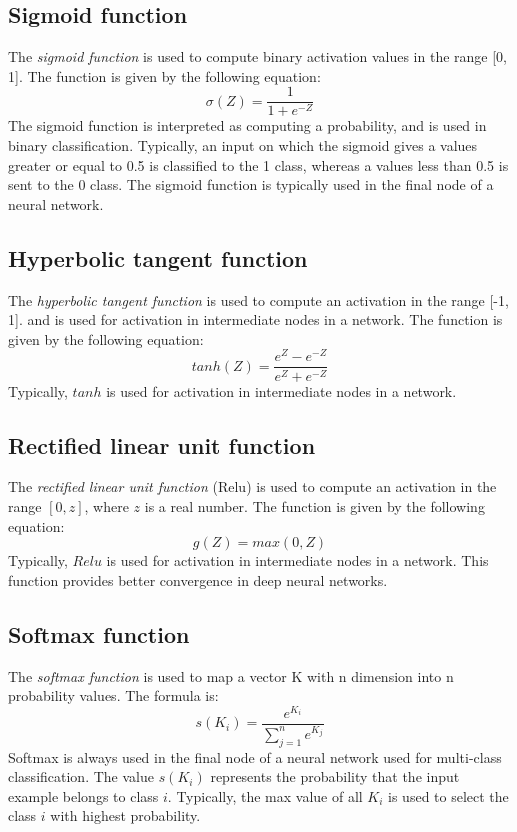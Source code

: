 \documentclass[12pt]{report}
\begin{document}
\subsection{Sigmoid function}
The {\em sigmoid function} is used to compute binary activation values in the range [0, 1]. The function is given by the following equation:
\[
\sigma(Z) = \frac{1}{1 + e^{-Z}}
\] 
The sigmoid function is interpreted as computing a probability, and is used in binary classification. Typically, an input on which the sigmoid  gives a values greater or equal to 0.5 is classified to the 1 class, whereas a values less than 0.5 is sent to the 0 class. The sigmoid function is typically used 
in the final node of a neural network. 

\subsection{Hyperbolic tangent function}
The {\em hyperbolic tangent function} is used to compute an activation in the range [-1, 1]. and is used for activation in intermediate nodes 
in a network. The function is given by the following equation:
\[
tanh(Z) = \frac{e^Z - e^{-Z}}{e^Z + e^{-Z}}
\]
Typically, $tanh$  is used for activation in intermediate nodes in a network.

\subsection{Rectified linear unit function}
The {\em rectified linear unit  function} (Relu) is used to compute an activation in the range $[0, z]$, where $z$ is a real number. 
The function is given by the following equation:
\[
g(Z) = max(0, Z)
\]
Typically, $Relu$  is used for activation in intermediate nodes in a network. This function provides better convergence in deep neural networks. 

\subsection{Softmax function}
The {\em softmax function} is used to map a vector K with n dimension into n probability values. The formula is:
\[
s(K_i) = \frac{e^{K_i}}{\sum_{j=1}^{n}e^{K_j}}
\]
Softmax is always used in the final node of a neural network used for multi-class classification. The value $s(K_i)$ represents the probability that 
the input example belongs to class $i$. Typically, the max value of all $K_i$ is used to select the class $i$ with highest probability. 
\end{document}
